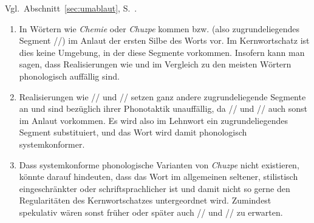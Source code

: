 
Vgl.\ Abschnitt~\ref{sec:umablaut}, S.\ \pageref{sec:umablaut}.


\begin{enumerate}\Lf
  \item In Wörtern wie \textit{Chemie} oder \textit{Chuzpe} kommen \textipa{[\c{c}]} bzw. \textipa{[X]} (also zugrundeliegendes Segment //) im Anlaut der ersten Silbe des Worts vor.
    Im Kernwortschatz ist dies keine Umgebung, in der diese Segmente vorkommen.
    Insofern kann man sagen, dass Realisierungen wie \textipa{[XU\t{ts}p@]} und \textipa{[\c{c}emi:]} im Vergleich zu den meisten Wörtern phonologisch auffällig sind.
  \item Realisierungen wie // und // setzen ganz andere zugrundeliegende Segmente an und sind bezüglich ihrer Phonotaktik unauffällig, da // und // auch sonst im Anlaut vorkommen.
    Es wird also im Lehnwort ein zugrundeliegendes Segment substituiert, und das Wort wird damit phonologisch systemkonformer.
  \item Dass systemkonforme phonologische Varianten von \textit{Chuzpe} nicht existieren, könnte darauf hindeuten, dass das Wort im allgemeinen seltener, stilistisch eingeschränkter oder schriftsprachlicher ist und damit nicht so gerne den Regularitäten des Kernwortschatzes untergeordnet wird.
    Zumindest spekulativ wären sonst früher oder später auch // und // zu erwarten.
\end{enumerate}


